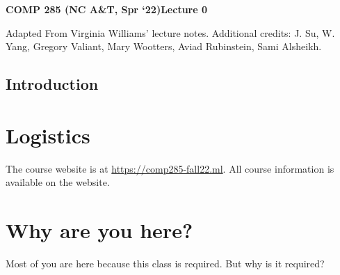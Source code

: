 \documentclass [12pt]{article}
\begin{document}
 

{\LARGE \textbf {COMP 285 (NC A\&T, Spr `22)}\hfill \textbf {Lecture 0} } 
\vspace {1em} 
\begin {Instruction} 

Adapted From Virginia Williams’ lecture notes. Additional credits: J. Su, W. Yang, Gregory Valiant, Mary Wootters, Aviad Rubinstein, Sami Alsheikh.
\end {Instruction} 

\begin{centering}
\section*{Introduction}
\end{centering}

\section{Logistics}

The course website is at \url{https://comp285-fall22.ml}. All course information is available on the website.

\section{Why are you here?}

Most of you are here because this class is required. But why is it required?
\end{document}
